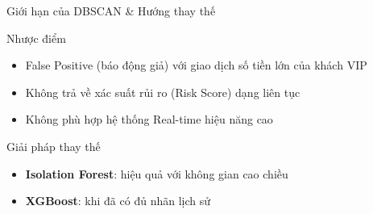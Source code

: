 \documentclass[aspectratio=169,11pt]{beamer}
\newcommand{\mellow}{\transfade[duration=0.5]}
\begin{document}
\begin{frame}{Giới hạn của DBSCAN \& Hướng thay thế}
  \mellow
  \begin{block}{Nhược điểm}
    \begin{itemize}
      \item False Positive (báo động giả) với giao dịch số tiền lớn của khách VIP
      \item Không trả về xác suất rủi ro (Risk Score) dạng liên tục
      \item Không phù hợp hệ thống Real-time hiệu năng cao
    \end{itemize}
  \end{block}
  \begin{block}{Giải pháp thay thế}
    \begin{itemize}
      \item \textbf{Isolation Forest}: hiệu quả với không gian cao chiều
      \item \textbf{XGBoost}: khi đã có đủ nhãn lịch sử
    \end{itemize}
  \end{block}
\end{frame}
\end{document}
